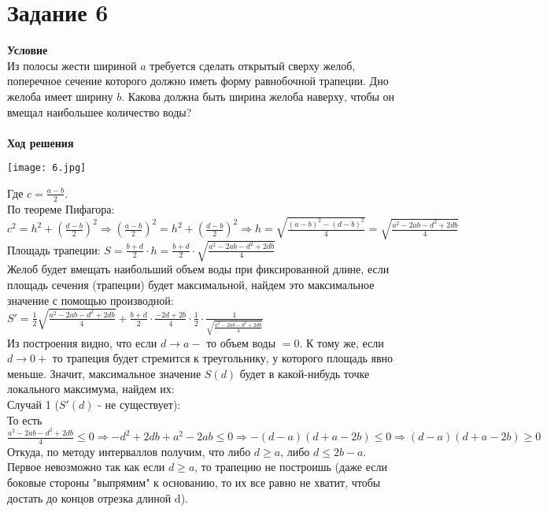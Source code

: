 
\newpage
\section{Задание 6}
{\bf\large Условие}\\
Из полосы жести шириной $a$ требуется сделать открытый сверху
желоб, поперечное сечение которого должно иметь форму равнобочной
трапеции. Дно желоба имеет ширину $b$. Какова должна быть ширина
желоба наверху, чтобы он вмещал наибольшее количество воды? \\
\\
{\bf\large Ход решения}
\begin{center}\texttt{[image: 6.jpg]}\end{center}
Где $c = \frac{a-b}{2}$. \\
По теореме Пифагора: $c^2 = h^2 + \left(\frac{d-b}{2}\right)^2 \Rightarrow \left(\frac{a-b}{2}\right)^2 = h^2 + \left(\frac{d-b}{2}\right)^2
\Rightarrow h = \sqrt{\frac{(a-b)^2-(d-b)^2}{4}} = \sqrt{\frac{a^2-2ab-d^2+2db}{4}}$ \\
Площадь трапеции: $S = \frac{b+d}{2}\cdot h = \frac{b+d}{2} \cdot \sqrt{\frac{a^2-2ab-d^2+2db}{4}}$ \\
Желоб будет вмещать наибольший объем воды при фиксированной длине, если площадь сечения (трапеции) будет максимальной, найдем это максимальное значение с помощью производной: \\
$S' = \frac{1}{2} \sqrt{\frac{a^2-2ab-d^2+2db}{4}} + \frac{b+d}{2} \cdot \frac{-2d+2b}{4} \cdot \frac{1}{2} \cdot \frac{1}{\sqrt{\frac{a^2-2ab-d^2+2db}{4}}}$ \\
Из построения видно, что если $d \rightarrow a-$ то объем воды $=0$. 
К тому же, если $d\rightarrow0+$ то трапеция будет стремится к треугольнику, у которого площадь явно меньше. 
Значит, максимальное значение $S(d)$ будет в какой-нибудь точке локального максимума, найдем их: \\
\linebreak
\noindent Случай 1 ($S'(d)$ - не существует): \\
То есть $\frac{a^2-2ab-d^2+2db}{4}\leq0 \Rightarrow -d^2 + 2db +a^2-2ab\leq 0 \Rightarrow -(d-a)(d+a-2b)\leq 0 \Rightarrow (d-a)(d+a-2b)\geq 0$ \\
Откуда, по методу интерваллов получим, что либо $d\geq a$, либо $d\leq 2b-a$. \\
Первое невозможно так как если $d\geq a$, то трапецию не построишь (даже если боковые стороны "выпрямим" \space к основанию, то их все равно не хватит, чтобы достать до концов отрезка длиной d). \\
